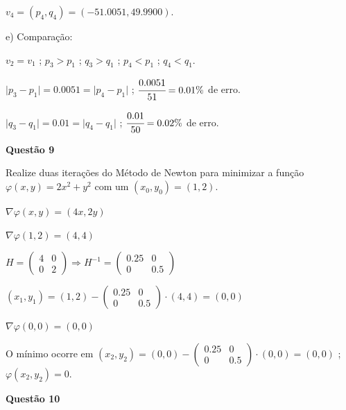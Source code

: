 \documentclass{rbfin}
\begin{document}
$v_4 = (p_4, q_4) = (-51.0051, 49.9900)$.

e) Comparação:

$v_2 = v_1$ ; $p_3 > p_1$ ; $q_3 > q_1$ ; $p_4 < p_1$ ; $q_4 < q_1$.

$\vert p_3 - p_1 \vert = 0.0051 = \vert p_4 - p_1 \vert$ ; $\cfrac{0.0051}{51} = 0.01\%$ de erro.

$\vert q_3 - q_1 \vert = 0.01 = \vert q_4 - q_1 \vert$ ; $\cfrac{0.01}{50} = 0.02\%$ de erro.

\singlespacing

\newpage

\large

\textbf{Questão 9}

\normalsize

\vspace{6mm}

\doublespacing

Realize duas iterações do Método de Newton para minimizar a função $\varphi(x, y) = 2 x^2 + y^2$ com um $(x_0, y_0) = (1, 2)$.

$\nabla \varphi(x,y) = (4x, 2y)$

$\nabla \varphi(1, 2) = (4, 4)$

$H = \begin{pmatrix} 4 & 0 \\ 0 & 2 \end{pmatrix} \Rightarrow H^{-1} = \begin{pmatrix} 0.25 & 0 \\ 0 & 0.5 \end{pmatrix}$

$(x_1, y_1) = (1, 2) - \begin{pmatrix} 0.25 & 0 \\ 0 & 0.5 \end{pmatrix} \cdot (4, 4) = (0 , 0)$

$\nabla \varphi(0, 0) = (0, 0)$

O mínimo ocorre em $(x_2, y_2) = (0, 0) - \begin{pmatrix} 0.25 & 0 \\ 0 & 0.5 \end{pmatrix} \cdot (0, 0) = (0, 0)$ ; $\varphi(x_2, y_2) = 0$.

\singlespacing

\vspace{6mm}

\large

\textbf{Questão 10}

\normalsize
\end{document}
